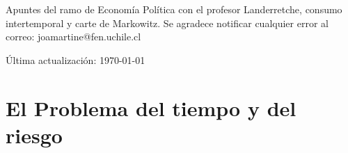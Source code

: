 \documentclass[12pt]{book}
\begin{document}
Apuntes del ramo de Economía Política con el profesor Landerretche, consumo intertemporal y carte de Markowitz. Se agradece notificar cualquier error al correo: joamartine@fen.uchile.cl

Última actualización: \today

\newpage

\setcounter{chapter}{3}

\chapter{El Problema del tiempo y del riesgo}



\newpage



\newpage

\begin{appendices}
    
\end{appendices}
\end{document}
